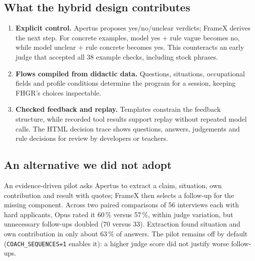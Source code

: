 \documentclass[10pt,a4paper]{article}
\begin{document}
\subsection*{What the hybrid design contributes}
\begin{enumerate}[leftmargin=1.4em,itemsep=4pt]
\item \textbf{Explicit control.} Apertus proposes yes/no/unclear verdicts; FrameX derives the next step.
For concrete examples, model yes + rule vague becomes no, while model unclear + rule concrete becomes yes.
This counteracts an early judge that accepted all 38 example checks, including stock phrases.
\item \textbf{Flows compiled from didactic data.} Questions, situations, occupational fields and profile
conditions determine the program for a session, keeping FHGR's choices inspectable.
\item \textbf{Checked feedback and replay.} Templates constrain the feedback structure, while recorded tool
results support replay without repeated model calls. The HTML decision trace shows questions, answers,
judgements and rule decisions for review by developers or teachers.
\end{enumerate}

\subsection*{An alternative we did not adopt}
An evidence-driven pilot asks Apertus to extract a claim, situation, own contribution and result with
quotes; FrameX then selects a follow-up for the missing component. Across two paired comparisons of
56 interviews each with hard applicants, Opus rated it 60\,\% versus 57\,\%, within judge variation, but
unnecessary follow-ups doubled (70 versus 33). Extraction found situation and own contribution in only
about 63\,\% of answers. The pilot remains off by default (\texttt{COACH\_SEQUENCES=1} enables it): a higher
judge score did not justify worse follow-ups.

\clearpage
\end{document}

